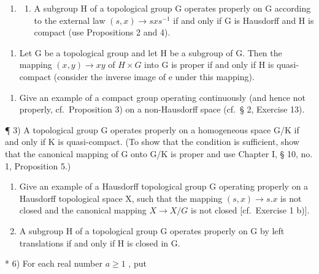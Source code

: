 \BourbakiExerciseGroup

\begin{enumerate}
\def\labelenumi{\arabic{enumi})}
\tightlist
\item
  \begin{enumerate}
  \def\labelenumii{\alph{enumii})}
  \tightlist
  \item
    A subgroup H of a topological group G operates properly on G according to the external law \((s, x) \rightarrow sxs^{-1}\) if and only if G is Hausdorff and H is compact (use Propositions 2 and 4).
  \end{enumerate}
\end{enumerate}

\begin{enumerate}
\def\labelenumi{\alph{enumi})}
\setcounter{enumi}{1}
\tightlist
\item
  Let G be a topological group and let H be a subgroup of G. Then the mapping \((x,y)\to xy\) of \(H\times G\) into G is proper if and only if H is quasi-compact (consider the inverse image of e under this mapping).
\end{enumerate}

\begin{enumerate}
\def\labelenumi{\arabic{enumi})}
\setcounter{enumi}{1}
\tightlist
\item
  Give an example of a compact group operating continuously (and hence not properly, cf.~Proposition 3) on a non-Hausdorff space (cf.~§ 2, Exercise 13).
\end{enumerate}

¶ 3) A topological group G operates properly on a homogeneous space G/K if and only if K is quasi-compact. (To show that the condition is sufficient, show that the canonical mapping of G onto G/K is proper and use Chapter I, § 10, no. 1, Proposition 5.)

\begin{enumerate}
\def\labelenumi{\arabic{enumi})}
\setcounter{enumi}{3}
\item
  Give an example of a Hausdorff topological group G operating properly on a Hausdorff topological space X, such that the mapping \((s, x) \rightarrow s.x\) is not closed and the canonical mapping \(X \rightarrow X/G\) is not closed {[}cf.~Exercise 1 b){]}.
\item
  A subgroup H of a topological group G operates properly on G by left translations if and only if H is closed in G.
\end{enumerate}

* 6) For each real number \(a \geqslant 1\) , put

